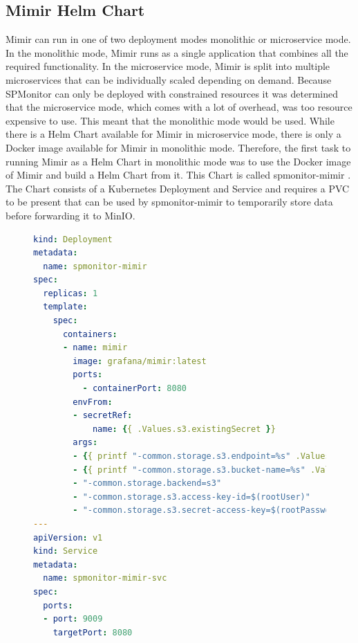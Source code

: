\subsection*{Mimir Helm Chart}

Mimir can run in one of two deployment modes monolithic or microservice mode.
In the monolithic mode, Mimir runs as a single application that combines all the required functionality.
In the microservice mode, Mimir is split into multiple microservices that can be individually
scaled depending on demand. Because SPMonitor can only be deployed with constrained resources it was determined
that the microservice mode, which comes with a lot of overhead, was too resource expensive to use.
This meant that the monolithic mode would be used. While there is a Helm Chart available for Mimir
in microservice mode, there is only a Docker image \cite{MIM-IMG} available for Mimir in monolithic mode.
Therefore, the first task to running Mimir as a Helm Chart in monolithic mode was to use
the Docker image of Mimir and build a Helm Chart from it. This Chart is called spmonitor-mimir \cite{CM-G-SPM}.
The Chart consists of a Kubernetes Deployment and Service and requires a PVC
to be present that can be used by spmonitor-mimir to temporarily store data before forwarding it
to MinIO.

\begin{figure}[tb]
\begin{lstlisting}[caption = {SPMonitor's Mimir Deployment}, label = {lis:spmonitor_mimir_deployment}, style = kit-cm, language=yaml]
kind: Deployment
metadata:
  name: spmonitor-mimir
spec:
  replicas: 1
  template:
    spec:
      containers:
      - name: mimir
        image: grafana/mimir:latest
        ports:
          - containerPort: 8080
        envFrom:
        - secretRef:
            name: {{ .Values.s3.existingSecret }}
        args:
        - {{ printf "-common.storage.s3.endpoint=%s" .Values.s3.endpoint }}
        - {{ printf "-common.storage.s3.bucket-name=%s" .Values.s3.bucket_name }}
        - "-common.storage.backend=s3"
        - "-common.storage.s3.access-key-id=$(rootUser)"
        - "-common.storage.s3.secret-access-key=$(rootPassword)"
---
apiVersion: v1
kind: Service
metadata:
  name: spmonitor-mimir-svc
spec:
  ports:
  - port: 9009
    targetPort: 8080
\end{lstlisting}
\end{figure}

